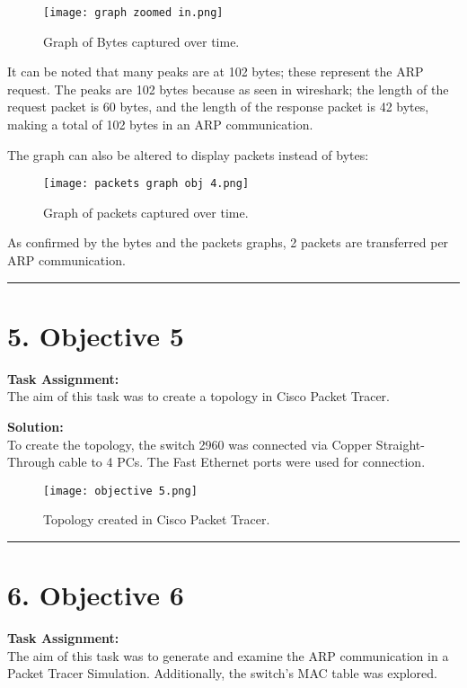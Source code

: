 \documentclass[a4paper,12pt]{article}
\begin{document}
\begin{figure}[H]
\centering
\texttt{[image: graph zoomed in.png]}
\caption{Graph of Bytes captured over time.}
\end{figure}

It can be noted that many peaks are at 102 bytes; these represent the ARP request. The peaks are 102 bytes because as seen in wireshark; the length of the request packet is 60 bytes, and the length of the response packet is 42 bytes, making a total of 102 bytes in an ARP communication.

The graph can also be altered to display packets instead of bytes:
\begin{figure}[H]
\centering
\texttt{[image: packets graph obj 4.png]}
\caption{Graph of packets captured over time.}
\end{figure}
As confirmed by the bytes and the packets graphs, 2 packets are transferred per ARP communication.

\vspace{1em}
\hrule
\vspace{0.5em}
\pagebreak
\section*{5. Objective 5}

\textbf{Task Assignment:} \\
The aim of this task was to create a topology in Cisco Packet Tracer.

\textbf{Solution:} \\
To create the topology, the switch 2960 was connected via Copper Straight-Through cable to 4 PCs. The Fast Ethernet ports were used for connection.
\begin{figure}[H]
\centering
\texttt{[image: objective 5.png]}
\caption{Topology created in Cisco Packet Tracer.}
\end{figure}

\vspace{1em}
\hrule
\vspace{0.5em}
\pagebreak
\section*{6. Objective 6}

\textbf{Task Assignment:} \\
The aim of this task was to generate and examine the ARP communication in a Packet Tracer Simulation. Additionally, the switch's MAC table was explored.
\end{document}
